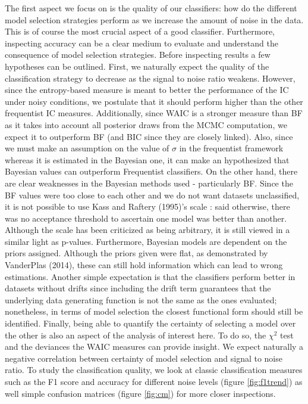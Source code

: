 \documentclass[12pt,]{article}
\begin{document}
The first aspect we focus on is the quality of our classifiers: how do the different model selection strategies perform as we increase the amount of noise in the data. This is of course the most crucial aspect of a good classifier. Furthermore, inspecting accuracy can be a clear medium to evaluate and understand the consequence of model selection strategies. Before inspecting results a few hypotheses can be outlined. First, we naturally expect the quality of the classification strategy to decrease as the signal to noise ratio weakens. However, since the entropy-based measure is meant to better the performance of the IC under noisy conditions, we postulate that it should perform higher than the other frequentist IC measures. Additionally, since WAIC is a stronger measure than BF as it takes into account all posterior draws from the MCMC computation, we expect it to outperform BF (and BIC since they are closely linked). Also, since we must make an assumption on the value of \(\sigma\) in the frequentist framework whereas it is estimated in the Bayesian one, it can make an hypothesized that Bayesian values can outperform Frequentist classifiers. On the other hand, there are clear weaknesses in the Bayesian methods used - particularly BF. Since the BF values were too close to each other and we do not want datasets unclassified, it is not possible to use Kass and Raftery (1995)'s scale : said otherwise, there was no acceptance threshold to ascertain one model was better than another. Although the scale has been criticized as being arbitrary, it is still viewed in a similar light as p-values. Furthermore, Bayesian models are dependent on the priors assigned. Although the priors given were flat, as demonstrated by VanderPlas (2014), these can still hold information which can lead to wrong estimations. Another simple expectation is that the classifiers perform better in datasets without drifts since including the drift term guarantees that the underlying data generating function is not the same as the ones evaluated; nonetheless, in terms of model selection the closest functional form should still be identified. Finally, being able to quantify the certainty of selecting a model over the other is also an aspect of the analysis of interest here. To do so, the \(\chi^2\) test and the deviances the WAIC measures can provide insight. We expect naturally a negative correlation between certainty of model selection and signal to noise ratio. To study the classification quality, we look at classic classification measures such as the F1 score and accuracy for different noise levels (figure \ref{fig:f1trend}) as well simple confusion matrices (figure \ref{fig:cm}) for more closer inspections.
\end{document}
